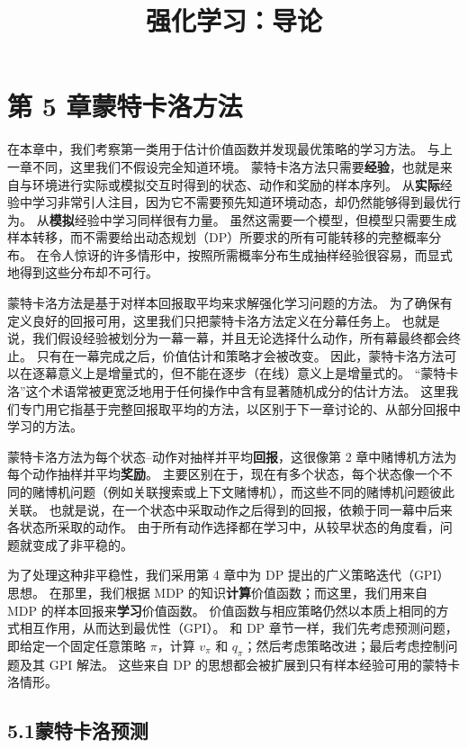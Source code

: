 \documentclass[UTF8, 12pt, fontset=fandol, oneside]{ctexart}
\title{强化学习：导论}
\author{}
\date{}
\begin{document}
\maketitle

\section*{第 5 章\quad 蒙特卡洛方法}

在本章中，我们考察第一类用于估计价值函数并发现最优策略的学习方法。
与上一章不同，这里我们不假设完全知道环境。
蒙特卡洛方法只需要\textbf{经验}，也就是来自与环境进行实际或模拟交互时得到的状态、动作和奖励的样本序列。
从\textbf{实际}经验中学习非常引人注目，因为它不需要预先知道环境动态，却仍然能够得到最优行为。
从\textbf{模拟}经验中学习同样很有力量。
虽然这需要一个模型，但模型只需要生成样本转移，而不需要给出动态规划（DP）所要求的所有可能转移的完整概率分布。
在令人惊讶的许多情形中，按照所需概率分布生成抽样经验很容易，而显式地得到这些分布却不可行。

蒙特卡洛方法是基于对样本回报取平均来求解强化学习问题的方法。
为了确保有定义良好的回报可用，这里我们只把蒙特卡洛方法定义在分幕任务上。
也就是说，我们假设经验被划分为一幕一幕，并且无论选择什么动作，所有幕最终都会终止。
只有在一幕完成之后，价值估计和策略才会被改变。
因此，蒙特卡洛方法可以在逐幕意义上是增量式的，但不能在逐步（在线）意义上是增量式的。
“蒙特卡洛”这个术语常被更宽泛地用于任何操作中含有显著随机成分的估计方法。
这里我们专门用它指基于完整回报取平均的方法，以区别于下一章讨论的、从部分回报中学习的方法。

蒙特卡洛方法为每个状态--动作对抽样并平均\textbf{回报}，这很像第 2 章中赌博机方法为每个动作抽样并平均\textbf{奖励}。
主要区别在于，现在有多个状态，每个状态像一个不同的赌博机问题（例如关联搜索或上下文赌博机），而这些不同的赌博机问题彼此关联。
也就是说，在一个状态中采取动作之后得到的回报，依赖于同一幕中后来各状态所采取的动作。
由于所有动作选择都在学习中，从较早状态的角度看，问题就变成了非平稳的。

为了处理这种非平稳性，我们采用第 4 章中为 DP 提出的广义策略迭代（GPI）思想。
在那里，我们根据 MDP 的知识\textbf{计算}价值函数；而这里，我们用来自 MDP 的样本回报来\textbf{学习}价值函数。
价值函数与相应策略仍然以本质上相同的方式相互作用，从而达到最优性（GPI）。
和 DP 章节一样，我们先考虑预测问题，即给定一个固定任意策略 $\pi$，计算 $v_\pi$ 和 $q_\pi$；然后考虑策略改进；最后考虑控制问题及其 GPI 解法。
这些来自 DP 的思想都会被扩展到只有样本经验可用的蒙特卡洛情形。

\subsection*{5.1\quad 蒙特卡洛预测}
\end{document}
